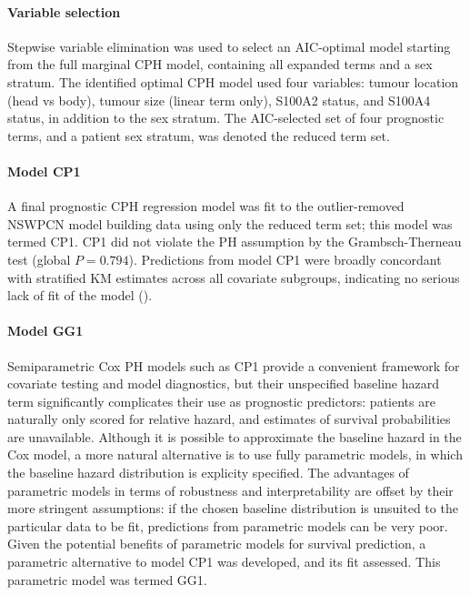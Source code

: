 \documentclass[dissertation.tex]{subfiles}
\begin{document}
\paragraph{Variable selection}
Stepwise variable elimination was used to select an \gls{AIC}-optimal model starting from the full marginal \gls{CPH} model, containing all expanded terms and a sex stratum.  The identified optimal \gls{CPH} model used four variables: tumour location (head vs body), tumour size (linear term only), S100A2 status, and S100A4 status, in addition to the sex stratum.  The \gls{AIC}-selected set of four prognostic terms, and a patient sex stratum, was denoted the reduced term set.

\paragraph{Model CP1}
A final prognostic \acrshort{CPH} regression model was fit to the outlier-removed \gls{NSWPCN} model building data using only the reduced term set; this model was termed CP1.  CP1 did not violate the \gls{PH} assumption by the Grambsch-Therneau test (global $P = 0.794$).  Predictions from model CP1 were broadly concordant with stratified \gls{KM} estimates across all covariate subgroups, indicating no serious lack of fit of the model ().

\paragraph{Model GG1}
Semiparametric Cox \gls{PH} models such as CP1 provide a convenient framework for covariate testing and model diagnostics, but their unspecified baseline hazard term significantly complicates their use as prognostic predictors: patients are naturally only scored for relative hazard, and estimates of survival probabilities are unavailable.  Although it is possible to approximate the baseline hazard in the Cox model, a more natural alternative is to use fully parametric models, in which the baseline hazard distribution is explicity specified.  The advantages of parametric models in terms of robustness and interpretability are offset by their more stringent assumptions: if the chosen baseline distribution is unsuited to the particular data to be fit, predictions from parametric models can be very poor.  Given the potential benefits of parametric models for survival prediction, a parametric alternative to model CP1 was developed, and its fit assessed.  This parametric model was termed GG1.
\end{document}
